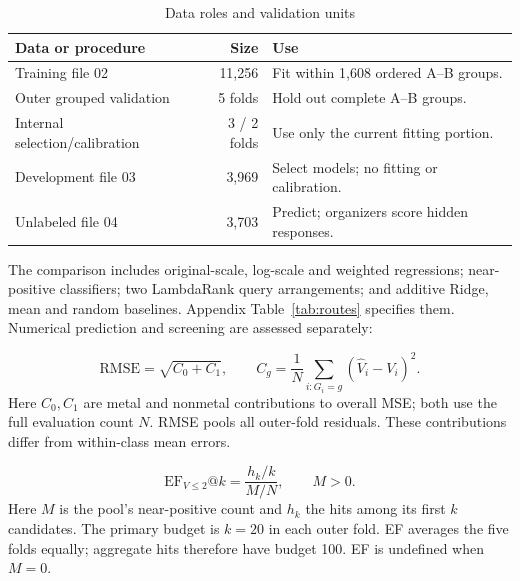 \par
\begin{table}[H]
\centering
\begin{threeparttable}
\caption{Data roles and validation units}\label{tab:protocol}
\begin{tabularx}{\linewidth}{@{}l r X@{}}
\toprule
Data or procedure & Size & Use\\
\midrule
Training file 02 & 11,256 & Fit within 1,608 ordered A--B groups.\\
Outer grouped validation & 5 folds & Hold out complete A--B groups.\\
Internal selection/calibration & 3 / 2 folds & Use only the current fitting portion.\\
Development file 03 & 3,969 & Select models; no fitting or calibration.\\
Unlabeled file 04 & 3,703 & Predict; organizers score hidden responses.\\
\bottomrule
\end{tabularx}
\end{threeparttable}
\end{table}
\par

The comparison includes original-scale, log-scale and weighted regressions; near-positive classifiers; two LambdaRank query arrangements; and additive Ridge, mean and random baselines. Appendix Table~\ref{tab:routes} specifies them. Numerical prediction and screening are assessed separately:
\begin{samepage}
\begin{equation}
 \mathrm{RMSE}=\sqrt{C_0+C_1},\qquad
 C_g=\frac{1}{N}\sum_{i:G_i=g}(\widehat V_i-V_i)^2.
 \label{eq:error}
\end{equation}
\noindent Here $C_0,C_1$ are metal and nonmetal contributions to overall MSE; both use the full evaluation count $N$. RMSE pools all outer-fold residuals. These contributions differ from within-class mean errors.
\end{samepage}
\begin{samepage}
\begin{equation}
 \mathrm{EF}_{V\le2}@k=\frac{h_k/k}{M/N},\qquad M>0.
 \label{eq:ef}
\end{equation}
\noindent Here $M$ is the pool's near-positive count and $h_k$ the hits among its first $k$ candidates. The primary budget is $k=20$ in each outer fold. EF averages the five folds equally; aggregate hits therefore have budget 100. EF is undefined when $M=0$.
\end{samepage}

